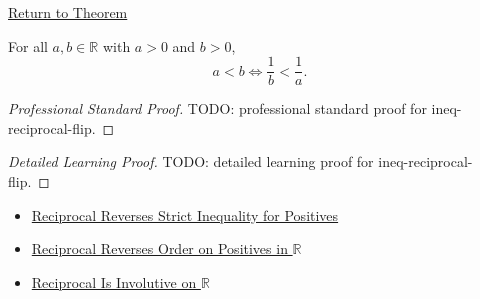 \newpage
{}
\label{prf:ineq-reciprocal-flip}

\begin{remark*}[Return]
\hyperref[thm:ineq-reciprocal-flip]{Return to Theorem}
\end{remark*}

\begin{theorem*}
For all $a, b \in \mathbb{R}$ with $a > 0$ and $b > 0$,
\[
  a < b \iff \frac{1}{b} < \frac{1}{a}.
\]
\end{theorem*}

\begin{proof}[Professional Standard Proof]
\LRAProofBodyStart
TODO: professional standard proof for ineq-reciprocal-flip.
\end{proof}

\begin{proof}[Detailed Learning Proof]
\LRAProofBodyStart
TODO: detailed learning proof for ineq-reciprocal-flip.
\end{proof}

\begin{remark*}
\end{remark*}

\begin{dependencies}
\begin{itemize}
  \item \hyperref[thm:ineq-reciprocal-positive]{Reciprocal Reverses Strict Inequality for Positives}
  \item \hyperref[thm:reciprocal-reverses-order-on-positives-r]{Reciprocal Reverses Order on Positives in $\mathbb{R}$}
  \item \hyperref[thm:reciprocal-involutive-on-r]{Reciprocal Is Involutive on $\mathbb{R}$}
\end{itemize}
\end{dependencies}

\clearpage
